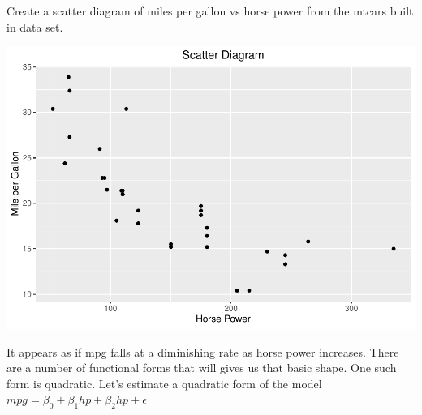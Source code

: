\documentclass[]{book}
\newenvironment{Shaded}{\begin{snugshade}}{\end{snugshade}}
\newcommand{\CommentTok}[1]{\textcolor[rgb]{0.56,0.35,0.01}{\textit{#1}}}
\newcommand{\DataTypeTok}[1]{\textcolor[rgb]{0.13,0.29,0.53}{#1}}
\newcommand{\DecValTok}[1]{\textcolor[rgb]{0.00,0.00,0.81}{#1}}
\newcommand{\FloatTok}[1]{\textcolor[rgb]{0.00,0.00,0.81}{#1}}
\newcommand{\KeywordTok}[1]{\textcolor[rgb]{0.13,0.29,0.53}{\textbf{#1}}}
\newcommand{\NormalTok}[1]{#1}
\newcommand{\OperatorTok}[1]{\textcolor[rgb]{0.81,0.36,0.00}{\textbf{#1}}}
\newcommand{\StringTok}[1]{\textcolor[rgb]{0.31,0.60,0.02}{#1}}
\begin{document}
Create a scatter diagram of miles per gallon vs horse power from the mtcars built in data set.

\begin{Shaded}
\end{Shaded}

\includegraphics{bailey_files/figure-latex/unnamed-chunk-78-1.pdf}

It appears as if mpg falls at a diminishing rate as horse power increases. There are a number of functional forms that will gives us that basic shape. One such form is quadratic. Let's estimate a quadratic form of the model \(mpg = \beta_0+\beta_1hp+\beta_2hp+\epsilon\)

\begin{Shaded}
\end{Shaded}
\end{document}
